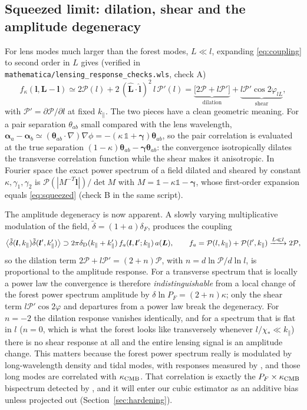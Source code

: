 \documentclass[11pt,a4paper]{article}
\newcommand{\dF}{\delta_F}
\newcommand{\dt}{\tilde\delta}
\newcommand{\vl}{\bm{l}}
\newcommand{\vL}{\bm{L}}
\newcommand{\vth}{\bm{\theta}}
\newcommand{\kpar}{k_\parallel}
\newcommand{\PP}{\mathcal{P}}
\newcommand{\dD}{\delta_{\rm D}}
\newcommand{\kcmb}{\kappa_{\rm CMB}}
\begin{document}
\subsection{Squeezed limit: dilation, shear and the amplitude degeneracy}
\label{sec:squeezed}

For lens modes much larger than the forest modes, $L\ll l$, expanding \eqref{eq:coupling} to second order in $L$ gives (verified in \texttt{mathematica/lensing\_response\_checks.wls}, check A)
\begin{equation}
f_\kappa(\vl,\vL-\vl)\simeq 2\PP(l)+2\,(\hat{\vL}\cdot\hat{\vl})^2\,l\,\PP'(l)
=\underbrace{\big[2\PP+l\PP'\big]}_{\text{dilation}}+\underbrace{l\PP'\cos2\varphi_{lL}}_{\text{shear}},
\label{eq:squeezed}
\end{equation}
with $\PP'=\partial\PP/\partial l$ at fixed $\kpar$. The two pieces have a clean geometric meaning. For a pair separation $\theta_{ab}$ small compared with the lens wavelength, $\bm\alpha_a-\bm\alpha_b\simeq(\vth_{ab}\cdot\nabla)\nabla\phi=-(\kappa\,\mathbb{1}+\bm\gamma)\vth_{ab}$, so the pair correlation is evaluated at the true separation $(1-\kappa)\vth_{ab}-\bm\gamma\vth_{ab}$: the convergence isotropically dilates the transverse correlation function while the shear makes it anisotropic. In Fourier space the exact power spectrum of a field dilated and sheared by constant $\kappa,\gamma_1,\gamma_2$ is $\PP(|M^{-T}\vl|)/\det M$ with $M=\mathbb{1}-\kappa\mathbb{1}-\bm\gamma$, whose first-order expansion equals \eqref{eq:squeezed} (check B in the same script).

The amplitude degeneracy is now apparent. A slowly varying multiplicative modulation of the field, $\dt=(1+a)\dF$, produces the coupling
\begin{equation}
\big\langle\dt(\vl,\kpar)\dt(\vl',\kpar')\big\rangle\supset 2\pi\dD(\kpar+\kpar')\,f_a(\vl,\vl';\kpar)\,a(\vL),\qquad f_a=\PP(l,\kpar)+\PP(l',\kpar)\xrightarrow{L\ll l}2\PP,
\label{eq:famp}
\end{equation}
so the dilation term $2\PP+l\PP'=(2+n)\PP$, with $n=d\ln\PP/d\ln l$, is proportional to the amplitude response. For a transverse spectrum that is locally a power law the convergence is therefore \emph{indistinguishable} from a local change of the forest power spectrum amplitude by $\delta\ln P_F=(2+n)\kappa$; only the shear term $l\PP'\cos2\varphi$ and departures from a power law break the degeneracy. For $n=-2$ the dilation response vanishes identically, and for a spectrum that is flat in $l$ ($n=0$, which is what the forest looks like transversely whenever $l/\chi_*\ll\kpar$) there is no shear response at all and the entire lensing signal is an amplitude change. This matters because the forest power spectrum really is modulated by long-wavelength density and tidal modes, with responses measured by \citet{1701.03375}, and those long modes are correlated with $\kcmb$. That correlation is exactly the $P_F\times\kcmb$ bispectrum detected by \citet{1607.03625,2405.14988}, and it will enter our cubic estimator as an additive bias unless projected out (Section~\ref{sec:hardening}).
\end{document}
